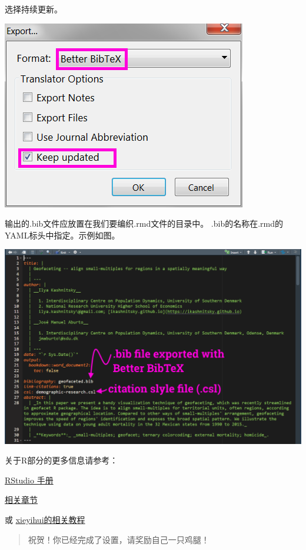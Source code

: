 \documentclass[
  letterpaper,
  DIV=11,
  numbers=noendperiod,
  oneside]{scrreprt}
\begin{document}
选择持续更新。

\includegraphics{./images/zotero_menu.png}

输出的.bib文件应放置在我们要编织.rmd文件的目录中。
.bib的名称在.rmd的YAML标头中指定。示例如图。

\includegraphics{./images/zotero_yaml.png}

关于R部分的更多信息请参考：

\href{https://rmarkdown.rstudio.com/authoring_bibliographies_and_citations.html}{RStudio
手册}

\href{https://bookdown.org/yihui/bookdown/citations.html}{相关章节}

或
\href{https://bookdown.org/yihui/bookdown/citations.html}{xieyihui的相关教程}

\begin{quote}
祝贺！你已经完成了设置，请奖励自己一只鸡腿！
\end{quote}

\end{document}
